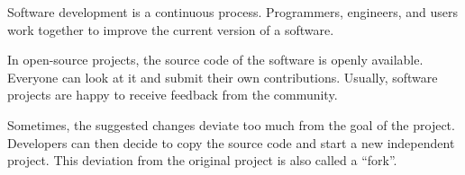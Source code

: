 
Software development is a continuous process. Programmers, engineers, and users work together to improve the current version of a software. 

In open-source projects, the source code of the software is openly available. Everyone can look at it and submit their own contributions. Usually, software projects are happy to receive feedback from the community. 

Sometimes, the suggested changes deviate too much from the goal of the project. Developers can then decide to copy the source code and start a new independent project. This deviation from the original project is also called a ``fork''.

